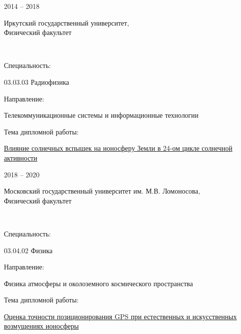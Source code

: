 \documentclass[10pt]{article}
\begin{document}
\begin{minipage}[t]{0.14\linewidth}\begin{bf}2014 -- 2018\end{bf}\end{minipage}
\begin{minipage}[t]{0.84\linewidth}
\begin{bf}
\begin{scshape}Иркутский государственный университет, \\ Физический факультет\end{scshape}
\end{bf} \\ [0.5em] 
\begin{small}
\begin{bf}Специальность:\end{bf} 03.03.03 Радиофизика \\
\begin{bf}Направление:\end{bf} Телекоммуникационные системы и информационные технологии \\
\begin{bf}Тема дипломной работы:\end{bf} \href{http://eportfolio.isu.ru/sites/default/files/userdata/4118/7/7_work_4118_6.pdf}{Влияние солнечных вспышек на ионосферу Земли в 24-ом цикле солнечной активности}
\end{small}
\end{minipage}

\vspace{2em}

\begin{minipage}[t]{0.14\linewidth}\begin{bf}2018 -- 2020\end{bf}\end{minipage}
\begin{minipage}[t]{0.84\linewidth}
\begin{bf}   
\begin{scshape}Московский государственный университет им. М.В. Ломоносова, \\ Физический факультет\end{scshape}
\end{bf} \\ [0.5em]
\begin{small}
\begin{bf}Специальность:\end{bf} 03.04.02 Физика \\
\begin{bf}Направление:\end{bf} Физика атмосферы и околоземного космического пространства \\
\begin{bf}Тема дипломной работы:\end{bf} \href{https://github.com/jonathanblade/master-diploma}{Оценка точности позиционирования GPS при естественных и искусственных возмущениях ионосферы}
\end{small}
\end{minipage}
\end{document}
